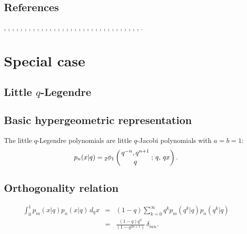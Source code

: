 \documentclass[envcountchap,graybox]{svmono}
\newcommand{\qhyp}[5]{\mbox{}_{#1}{\phi}_{#2}
\left(\genfrac{}{}{0pt}{}{#3}{#4}\,;\,q,\,#5\right)}
\newcommand{\qhyp}[5]{\,\mbox{}_{#1}\phi_{#2}\!\left(
  \genfrac{}{}{0pt}{}{#3}{#4};#5\right)}
\begin{document}
\subsection*{References}
\cite{NAlSalam89}, \cite{AlSalam90}, \cite{AlSalamIsmail77}, \cite{AlSalamIsmail83},
\cite{AndrewsAskey77}, \cite{AndrewsAskey85}, \cite{Askey89I}, \cite{AtakKlimyk2004},
\cite{AtakRahmanSuslov}, \cite{DattaGriffin}, \cite{Floris96}, \cite{Floris97},
\cite{FlorisKoelink}, \cite{GasperRahman84}, \cite{GasperRahman90}, \cite{GrunbaumHaine96},
\cite{Hahn}, \cite{Ismail86I}, \cite{IsmailMassonRahman}, \cite{IsmailWilson}, \cite{Kadell},
\cite{Koelink96I}, \cite{KoelinkKoorn}, \cite{Koorn89III}, \cite{Koorn90II},
\cite{Koorn91}, \cite{Koorn93}, \cite{Masuda+91}, \cite{Miller89}, \cite{Nikiforov+},
\cite{Rahman82}, \cite{Srivastava82}, \cite{SrivastavaJain90}, \cite{Stanton80I}.


\section*{Special case}

\subsection{Little $q$-Legendre}
\par

\subsection*{Basic hypergeometric representation} The little $q$-Legendre polynomials are little $q$-Jacobi
polynomials with $a=b=1$:
\begin{equation}
\label{DefLittleqLegendre}
p_n(x|q)=\qhyp{2}{1}{q^{-n},q^{n+1}}{q}{qx}.
\end{equation}

\subsection*{Orthogonality relation}
\begin{eqnarray}
\label{OrtLittleqLegendre}
\int_0^1p_m(x|q)p_n(x|q)\,d_qx&=&(1-q)\sum_{k=0}^{\infty}q^kp_m(q^k|q)p_n(q^k|q)\nonumber\\
&=&\frac{(1-q)q^n}{(1-q^{2n+1})}\,\delta_{mn}.
\end{eqnarray}
\end{document}
